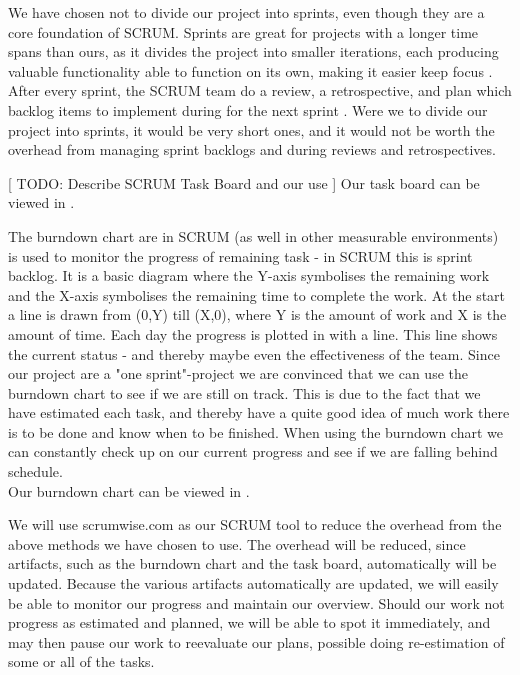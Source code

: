 We have chosen not to divide our project into sprints, even though they are a core foundation of SCRUM.
Sprints are great for projects with a longer time spans than ours, as it divides the project into smaller iterations, each producing valuable functionality able to function on its own, making it easier keep focus \cite[p. ?]{?}.
After every sprint, the SCRUM team do a review, a retrospective, and plan which backlog items to implement during for the next sprint \cite[p. 11]{scrum-org-guide}.
Were we to divide our project into sprints, it would be very short ones, and it would not be worth the overhead from managing sprint backlogs and during reviews and retrospectives.

[ TODO: Describe SCRUM Task Board and our use ]
Our task board can be viewed in .

The burndown chart are in SCRUM (as well in other measurable environments) is used to monitor the progress of remaining task - in SCRUM this is sprint backlog.
It is a basic diagram where the Y-axis symbolises the remaining work and the X-axis symbolises the remaining time to complete the work.
At the start a line is drawn from (0,Y) till (X,0), where Y is the amount of work and X is the amount of time.
Each day the progress is plotted in with a line. This line shows the current status - and thereby maybe even the effectiveness of the team.
Since our project are a "one sprint"-project we are convinced that we can use the burndown chart to see if we are still on track. This is due to the fact that we have estimated each task, and thereby have a quite good idea of much work there is to be done and know when to be finished. When using the burndown chart we can constantly check up on our current progress and see if we are falling behind schedule.\\
Our burndown chart can be viewed in .

We will use scrumwise.com as our SCRUM tool to reduce the overhead from the above methods we have chosen to use. The overhead will be reduced, since artifacts, such as the burndown chart and the task board, automatically will be updated.
Because the various artifacts automatically are updated, we will easily be able to monitor our progress and maintain our overview. Should our work not progress as estimated and planned, we will be able to spot it immediately, and may then pause our work to reevaluate our plans, possible doing re-estimation of some or all of the tasks.